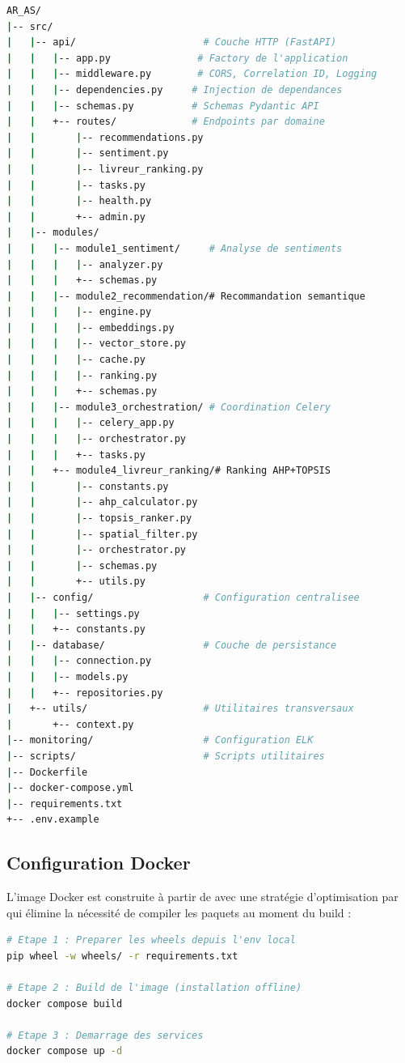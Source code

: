 \begin{lstlisting}[language=bash, caption={Arborescence du projet AR\_AS}]
AR_AS/
|-- src/
|   |-- api/                      # Couche HTTP (FastAPI)
|   |   |-- app.py               # Factory de l'application
|   |   |-- middleware.py        # CORS, Correlation ID, Logging
|   |   |-- dependencies.py     # Injection de dependances
|   |   |-- schemas.py          # Schemas Pydantic API
|   |   +-- routes/             # Endpoints par domaine
|   |       |-- recommendations.py
|   |       |-- sentiment.py
|   |       |-- livreur_ranking.py
|   |       |-- tasks.py
|   |       |-- health.py
|   |       +-- admin.py
|   |-- modules/
|   |   |-- module1_sentiment/     # Analyse de sentiments
|   |   |   |-- analyzer.py
|   |   |   +-- schemas.py
|   |   |-- module2_recommendation/# Recommandation semantique
|   |   |   |-- engine.py
|   |   |   |-- embeddings.py
|   |   |   |-- vector_store.py
|   |   |   |-- cache.py
|   |   |   |-- ranking.py
|   |   |   +-- schemas.py
|   |   |-- module3_orchestration/ # Coordination Celery
|   |   |   |-- celery_app.py
|   |   |   |-- orchestrator.py
|   |   |   +-- tasks.py
|   |   +-- module4_livreur_ranking/# Ranking AHP+TOPSIS
|   |       |-- constants.py
|   |       |-- ahp_calculator.py
|   |       |-- topsis_ranker.py
|   |       |-- spatial_filter.py
|   |       |-- orchestrator.py
|   |       |-- schemas.py
|   |       +-- utils.py
|   |-- config/                   # Configuration centralisee
|   |   |-- settings.py
|   |   +-- constants.py
|   |-- database/                 # Couche de persistance
|   |   |-- connection.py
|   |   |-- models.py
|   |   +-- repositories.py
|   +-- utils/                    # Utilitaires transversaux
|       +-- context.py
|-- monitoring/                   # Configuration ELK
|-- scripts/                      # Scripts utilitaires
|-- Dockerfile
|-- docker-compose.yml
|-- requirements.txt
+-- .env.example
\end{lstlisting}

\subsection{Configuration Docker}

L'image Docker est construite à partir de  avec une stratégie d'optimisation par  qui élimine la nécessité de compiler les paquets au moment du build :

\begin{lstlisting}[language=bash, caption={Processus de build Docker}]
# Etape 1 : Preparer les wheels depuis l'env local
pip wheel -w wheels/ -r requirements.txt

# Etape 2 : Build de l'image (installation offline)
docker compose build

# Etape 3 : Demarrage des services
docker compose up -d
\end{lstlisting}

